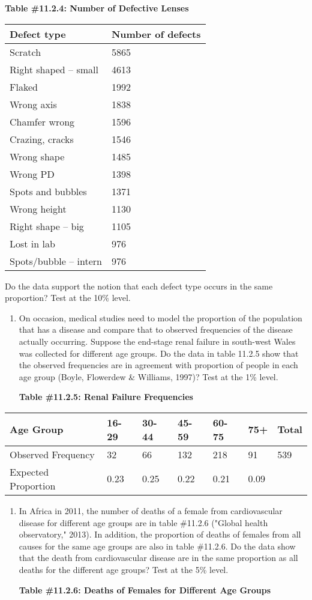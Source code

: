 \documentclass[]{book}
\begin{document}
\textbf{Table \#11.2.4: Number of Defective Lenses}

\begin{longtable}[]{@{}ll@{}}
\toprule
Defect type & Number of defects\tabularnewline
\midrule
\endhead
Scratch & 5865\tabularnewline
Right shaped -- small & 4613\tabularnewline
Flaked & 1992\tabularnewline
Wrong axis & 1838\tabularnewline
Chamfer wrong & 1596\tabularnewline
Crazing, cracks & 1546\tabularnewline
Wrong shape & 1485\tabularnewline
Wrong PD & 1398\tabularnewline
Spots and bubbles & 1371\tabularnewline
Wrong height & 1130\tabularnewline
Right shape -- big & 1105\tabularnewline
Lost in lab & 976\tabularnewline
Spots/bubble -- intern & 976\tabularnewline
\bottomrule
\end{longtable}

Do the data support the notion that each defect type occurs in the same proportion? Test at the 10\% level.

\begin{enumerate}
\def\labelenumi{\arabic{enumi}.}
\setcounter{enumi}{2}
\item
  On occasion, medical studies need to model the proportion of the population that has a disease and compare that to observed frequencies of the disease actually occurring. Suppose the end-stage renal failure in south-west Wales was collected for different age groups. Do the data in table 11.2.5 show that the observed frequencies are in agreement with proportion of people in each age group (Boyle, Flowerdew \& Williams, 1997)? Test at the 1\% level.

  \textbf{Table \#11.2.5: Renal Failure Frequencies}
\end{enumerate}

\begin{longtable}[]{@{}lllllll@{}}
\toprule
Age Group & 16-29 & 30-44 & 45-59 & 60-75 & 75+ & Total\tabularnewline
\midrule
\endhead
Observed Frequency & 32 & 66 & 132 & 218 & 91 & 539\tabularnewline
Expected Proportion & 0.23 & 0.25 & 0.22 & 0.21 & 0.09 &\tabularnewline
\bottomrule
\end{longtable}

\begin{enumerate}
\def\labelenumi{\arabic{enumi}.}
\setcounter{enumi}{3}
\item
  In Africa in 2011, the number of deaths of a female from cardiovascular disease for different age groups are in table \#11.2.6 ("Global health observatory," 2013). In addition, the proportion of deaths of females from all causes for the same age groups are also in table \#11.2.6. Do the data show that the death from cardiovascular disease are in the same proportion as all deaths for the different age groups? Test at the 5\% level.

  \textbf{Table \#11.2.6: Deaths of Females for Different Age Groups}
\end{enumerate}
\end{document}
